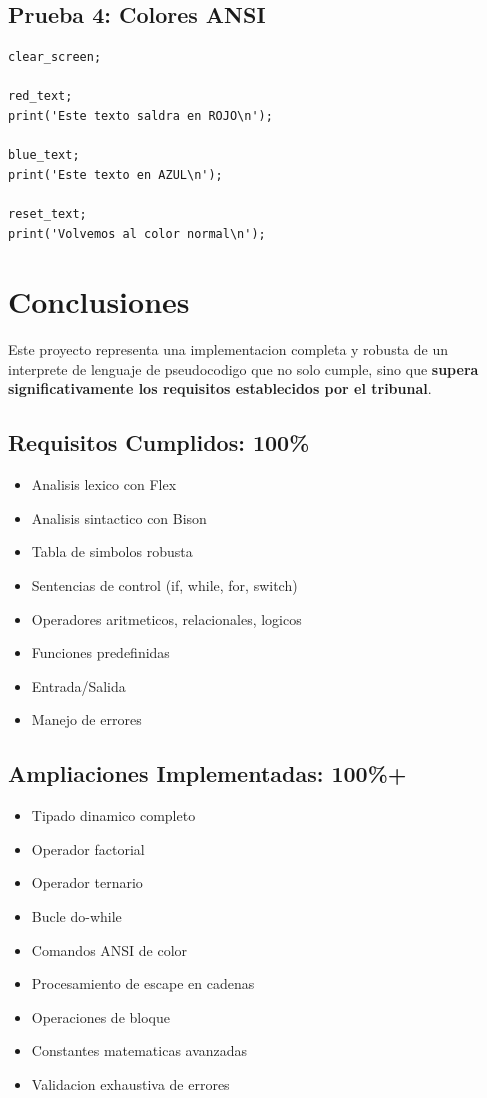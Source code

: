 \documentclass[11pt,a4paper]{article}
\begin{document}
\subsection{Prueba 4: Colores ANSI}

\begin{lstlisting}[caption={Programa: color.p}]
clear_screen;

red_text;
print('Este texto saldra en ROJO\n');

blue_text;
print('Este texto en AZUL\n');

reset_text;
print('Volvemos al color normal\n');
\end{lstlisting}

\newpage

\section{Conclusiones}

Este proyecto representa una implementacion completa y robusta de un interprete de lenguaje de pseudocodigo que no solo cumple, sino que \textbf{supera significativamente los requisitos establecidos por el tribunal}.

\subsection{Requisitos Cumplidos: 100\%}

\begin{itemize}
    \item Analisis lexico con Flex
    \item Analisis sintactico con Bison
    \item Tabla de simbolos robusta
    \item Sentencias de control (if, while, for, switch)
    \item Operadores aritmeticos, relacionales, logicos
    \item Funciones predefinidas
    \item Entrada/Salida
    \item Manejo de errores
\end{itemize}

\subsection{Ampliaciones Implementadas: 100\%+}

\begin{itemize}
    \item Tipado dinamico completo
    \item Operador factorial
    \item Operador ternario
    \item Bucle do-while
    \item Comandos ANSI de color
    \item Procesamiento de escape en cadenas
    \item Operaciones de bloque
    \item Constantes matematicas avanzadas
    \item Validacion exhaustiva de errores
\end{itemize}
\end{document}
